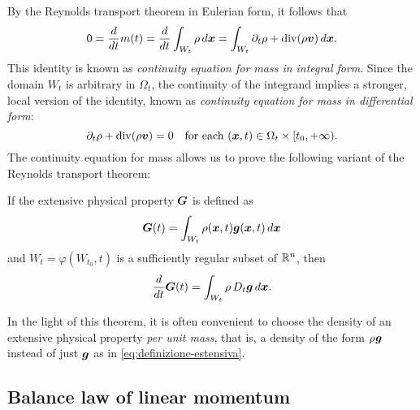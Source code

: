 By the Reynolds transport theorem in Eulerian form, it follows that
\begin{equation} \label{eq:continuita-forma-integrale}
0
= \frac{d}{dt} m(t)
= \frac{d}{dt} \int_{W_t} \rho \, d\bm{x}
= \int_{W_t} \partial_t \rho + \operatorname{div}(\rho \bm{v}) \, d\bm{x}.
\end{equation}
This identity is known as \emph{continuity equation for mass in integral form}.
Since the domain $W_t$ is arbitrary in $\Omega_t$, the continuity of the
integrand implies a stronger, local version of the identity, known as
\emph{continuity equation for mass in differential form}:
\begin{equation} \label{eq:continuita-forma-differenziale}
\partial_t \rho + \operatorname{div}(\rho \bm{v}) = 0
\quad \text{for each $(\bm{x},t) \in \Omega_t \times [t_0,+\infty)$.}
\end{equation}
The continuity equation for mass allows us to prove the following variant
of the Reynolds transport theorem:
\begin{theo} \label{teor:reynolds-per-unita-di-massa}
If the extensive physical property $\bm{G}$ is defined as
\[
\bm{G}(t) = \int_{W_t} \rho(\bm{x},t) \bm{g}(\bm{x},t) \, d\bm{x}
\]
and $W_t = \varphi(W_{t_0},t)$ is a sufficiently regular
subset of $\mathbb{R}^n$, then
\[
\frac{d}{dt} \bm{G}(t) = \int_{W_t} \rho \, D_t \bm{g} \, d\bm{x}.
\]
\end{theo}

\noindent In the light of this theorem, it is often convenient
to choose the density of an extensive physical property
\emph{per unit mass}, that is, a density of the form $\rho \:\! \bm{g}$
instead of just $\bm{g}$ as in \eqref{eq:definizione-estensiva}.

\subsection*{Balance law of linear momentum}

